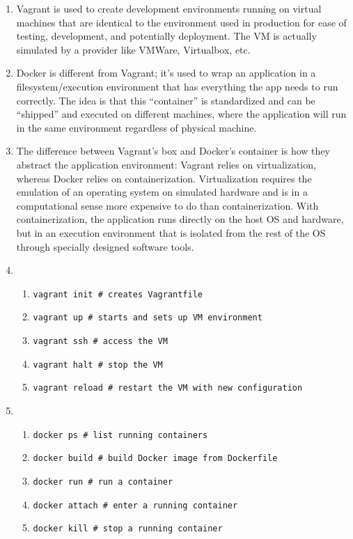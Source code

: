 \documentclass{report}
\begin{document}
\begin{problem}
\begin{answer}{35em}
  \begin{enumerate}
    \item Vagrant is used to create development environments running on
          virtual machines that are identical to the environment used in
          production for ease of testing, development, and potentially
          deployment. The VM is actually simulated by a provider like VMWare,
          Virtualbox, etc.
    \item Docker is different from Vagrant; it's used to wrap an application
          in a filesystem/execution environment that has everything the app
          needs to run correctly. The idea is that this ``container'' is
          standardized and can be ``shipped'' and executed on different
          machines, where the application will run in the same environment
          regardless of physical machine.
    \item The difference between Vagrant's box and Docker's container is how
          they abstract the application environment: Vagrant relies on
          virtualization, whereas Docker relies on containerization.
          Virtualization requires the emulation of an operating system on
          simulated hardware and is in a computational sense more expensive to
          do than containerization. With containerization, the application
          runs directly on the host OS and hardware, but in an execution
          environment that is isolated from the rest of the OS through
          specially designed software tools.
    \item
      \begin{enumerate}
        \item \texttt{vagrant init \# creates Vagrantfile}
        \item \texttt{vagrant up \# starts and sets up VM environment}
        \item \texttt{vagrant ssh \# access the VM}
        \item \texttt{vagrant halt \# stop the VM}
        \item \texttt{vagrant reload \# restart the VM with new configuration}
      \end{enumerate}
    \item
      \begin{enumerate}
        \item \texttt{docker ps \# list running containers}
        \item \texttt{docker build \# build Docker image from Dockerfile}
        \item \texttt{docker run \# run a container}
        \item \texttt{docker attach \# enter a running container}
        \item \texttt{docker kill \# stop a running container}
      \end{enumerate}
  \end{enumerate}
\end{answer}

\end{problem}
\end{document}
